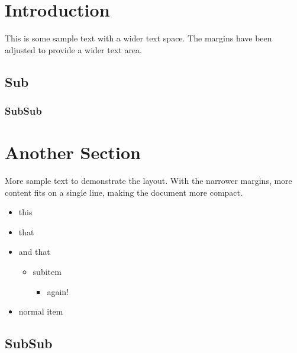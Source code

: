 \documentclass{article}
\begin{document}
	\color{gro}
	
	\section{Introduction}
	This is some sample text with a wider text space. The margins have been adjusted to provide a wider text area.
	
	\lipsum[1-4] %
	
	\subsection{Sub}
	
	\lipsum[1-2]
	
	\subsubsection{SubSub}
	
	\lipsum[1-2]
	
	\section{Another Section}
	More sample text to demonstrate the layout. With the narrower margins, more content fits on a single line, making the document more compact.
	
	\lipsum[5] %
	
	\begin{itemize}
		\item this
		\item that 
		\item and that
		\begin{itemize}
			\item subitem
			\begin{itemize}
				\item again!
			\end{itemize}
		\end{itemize}
		\item normal item
	\end{itemize}
	
	\subsection{SubSub}
	
	\lipsum[8-9]
	
\end{document}

